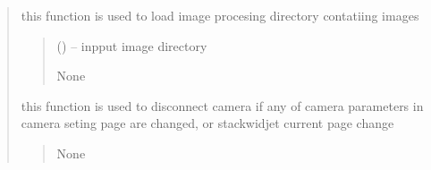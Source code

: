 \documentclass[letterpaper,10pt,english]{sphinxmanual}
\begin{document}
\begin{quote}
\begin{savenotes}
\begin{fulllineitems}
\begin{savenotes}\begin{fulllineitems}
\label{\detokenize{setting/setting_api:oxin.setting_api.API.control_list_image}}
\pysigstartsignatures
{}
\pysigstopsignatures
\sphinxAtStartPar
this function is used to load image procesing directory contatiing images
\begin{quote}\begin{description}
\sphinxAtStartPar
{} () – inpput image directory

\sphinxAtStartPar
None

\end{description}\end{quote}

\end{fulllineitems}\end{savenotes}


\begin{savenotes}\begin{fulllineitems}
\label{\detokenize{setting/setting_api:oxin.setting_api.API.disconnect_camera_on_ui_change}}
\pysigstartsignatures
{}
\pysigstopsignatures
\sphinxAtStartPar
this function is used to disconnect camera if any of camera parameters in camera seting page are changed, or stackwidjet current page change
\begin{quote}\begin{description}
\sphinxAtStartPar
None

\end{description}\end{quote}

\end{fulllineitems}\end{savenotes}



\end{fulllineitems}
\end{savenotes}
\end{quote}
\end{document}
